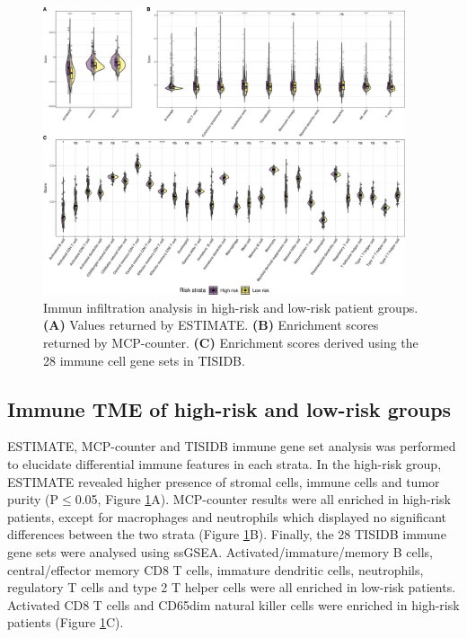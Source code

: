 \documentclass[twocolumn]{bmcart}%
\begin{document}
\begin{figure}[h!]
    \includegraphics[width=0.95\textwidth]{figures/Immune_plots2.png}
    \caption{Immun infiltration analysis in high-risk and low-risk patient groups. \textbf{(A)} Values returned by ESTIMATE. \textbf{(B)} Enrichment scores returned by MCP-counter. \textbf{(C)} Enrichment scores derived using the 28 immune cell gene sets in TISIDB.}
    \label{fig:immune}
\end{figure}

\subsection*{\textbf{Immune TME of high-risk and low-risk groups}}
ESTIMATE, MCP-counter and TISIDB immune gene set analysis was performed to elucidate differential immune features in each strata. In the high-risk group, ESTIMATE revealed higher presence of stromal cells, immune cells and tumor purity (P$\leq$0.05, Figure \ref{fig:immune}A). MCP-counter results were all enriched in high-risk patients, except for macrophages and neutrophils which displayed no significant differences between the two strata (Figure \ref{fig:immune}B). Finally, the 28 TISIDB immune gene sets were analysed using ssGSEA. Activated/immature/memory B cells, central/effector memory CD8 T cells, immature dendritic cells, neutrophils, regulatory T cells and type 2 T helper cells were all enriched in low-risk patients. Activated CD8 T cells and CD65dim natural killer cells were enriched in high-risk patients (Figure \ref{fig:immune}C). 
\end{document}
